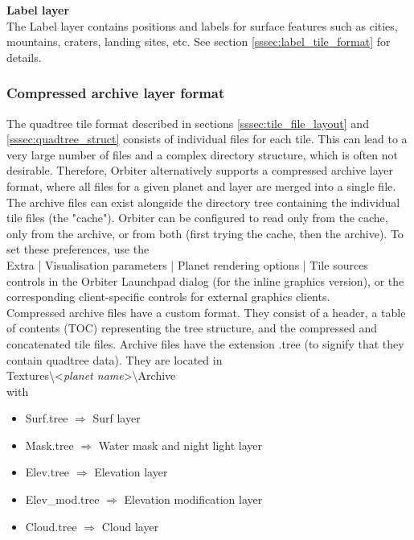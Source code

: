 \documentclass[Orbiter Developer Manual.tex]{subfiles}
\begin{document}
\noindent
\textbf{Label layer}\\
The Label layer contains positions and labels for surface features such as cities, mountains, craters, landing sites, etc. See section \ref{sssec:label_tile_format} for details.


\subsubsection{Compressed archive layer format}
\label{sssec:compress_archive_layer}
The quadtree tile format described in sections \ref{sssec:tile_file_layout} and \ref{sssec:quadtree_struct} consists of individual files for each tile. This can lead to a very large number of files and a complex directory structure, which is often not desirable. Therefore, Orbiter alternatively supports a compressed archive layer format, where all files for a given planet and layer are merged into a single file.\\
The archive files can exist alongside the directory tree containing the individual tile files (the "cache"). Orbiter can be configured to read only from the cache, only from the archive, or from both (first trying the cache, then the archive). To set these preferences, use the\\
\indent Extra | Visualisation parameters | Planet rendering options | Tile sources\\
controls in the Orbiter Launchpad dialog (for the inline graphics version), or the corresponding client-specific controls for external graphics clients.\\
Compressed archive files have a custom format. They consist of a header, a table of contents (TOC) representing the tree structure, and the compressed and concatenated tile files. Archive files have the extension .tree (to signify that they contain quadtree data). They are located in\\
\indent Textures\textbackslash <\textit{planet name}>\textbackslash Archive\\
with

\begin{itemize}
\item Surf.tree $\Rightarrow$ Surf layer
\item Mask.tree $\Rightarrow$ Water mask and night light layer
\item Elev.tree $\Rightarrow$ Elevation layer
\item Elev\_mod.tree $\Rightarrow$ Elevation modification layer
\item Cloud.tree $\Rightarrow$ Cloud layer
\end{itemize}
\end{document}
